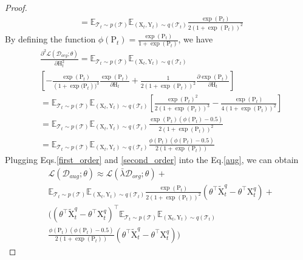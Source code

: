 \begin{proof}
\begin{equation}
\begin{aligned}
    &= \mathbb E_{\mathcal{T}_t\sim p(\mathcal{T})}\mathbb E_{(\mathrm{X}_t,\mathrm{Y}_t)\sim q(\mathcal{T}_t)}\frac{\exp(\mathrm{P}_t)}{2(1+\exp(\mathrm{P}_t))^2}
\end{aligned}
\end{equation}
By defining the function $\phi(\mathrm{P}_t)=\frac{\exp(\mathrm{P}_t)}{1+\exp({\mathrm{P}_t})}$, we have
\begin{equation}
\label{second_order}
    \begin{aligned}
        &\frac{\partial^2 \mathcal{L}(\mathcal{D}_{org};\theta)}{\partial \mathrm{H}_t^2} = \mathbb E_{\mathcal{T}_t\sim p(\mathcal{T})}\mathbb E_{(\mathrm{X}_t,\mathrm{Y}_t)\sim q(\mathcal{T}_t)} \\
        &\left[-\frac{\exp{(\mathrm{P}_t)}}{(1+\exp{(\mathrm{P}_t}))^3}\frac{\exp{(\mathrm{P}_t)}}{\partial \mathrm{H}_t} + \frac{1}{2(1+\exp{(\mathrm{P}_t)})^2}\frac{\partial \exp{(\mathrm{P}_t)}}{\partial \mathrm{H}_t} \right] \\
        &= \mathbb E_{\mathcal{T}_t\sim p(\mathcal{T})}\mathbb E_{(\mathrm{X}_t,\mathrm{Y}_t)\sim q(\mathcal{T}_t)} \left[ \frac{\exp{(\mathrm{P}_t)^2}}{2(1+\exp{(\mathrm{P}_t)})^3} - \frac{\exp{(\mathrm{P}_t)}}{4(1+\exp{(\mathrm{P}_t)})^2} \right] \\
        &= \mathbb E_{\mathcal{T}_t\sim p(\mathcal{T})}\mathbb E_{(\mathrm{X}_t,\mathrm{Y}_t)\sim q(\mathcal{T}_t)} \frac{\exp{(\mathrm{P}_t)}(\phi(\mathrm{P}_t)-0.5)}{2(1+\exp{(\mathrm{P}_t)})^2} \\
        &= \mathbb E_{\mathcal{T}_t\sim p(\mathcal{T})}\mathbb E_{(\mathrm{X}_t,\mathrm{Y}_t)\sim q(\mathcal{T}_t)} \frac{\phi(\mathrm{P}_t)(\phi(\mathrm{P}_t)-0.5)}{2(1+\exp{(\mathrm{P}_t)})}
    \end{aligned}
\end{equation}
Plugging Eqs.\ref{first_order} and \ref{second_order} into the Eq.\ref{aug}, we can obtain
\begin{equation}
    \begin{aligned}
    \label{aug_refine}
        &\mathcal{L}(\mathcal{D}_{aug};\theta)\approx \mathcal{L}(\bar{\lambda}\mathcal{D}_{org};\theta) + \\
        & \mathbb E_{\mathcal{T}_t\sim p(\mathcal{T})}\mathbb E_{(\mathrm{X}_t,\mathrm{Y}_t)\sim q(\mathcal{T}_t)}\frac{\exp(\mathrm{P}_t)}{2(1+\exp(\mathrm{P}_t))^2} (\theta^\top\tilde{\mathrm{X}}_t^q-\theta^\top\mathrm{X}_t^q) + \\
        &\Big((\theta^\top\tilde{\mathrm{X}}_t^q-\theta^\top\mathrm{X}_t^q)^\top\mathbb E_{\mathcal{T}_t\sim p(\mathcal{T})}\mathbb E_{(\mathrm{X}_t,\mathrm{Y}_t)\sim q(\mathcal{T}_t)} \\ &\frac{\phi(\mathrm{P}_t)(\phi(\mathrm{P}_t)-0.5)}{2(1+\exp{(\mathrm{P}_t)})}(\theta^\top\tilde{\mathrm{X}}_t^q-\theta^\top\mathrm{X}_t^q)\Big)
    \end{aligned}
\end{equation}


\end{proof}
